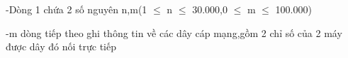 -Dòng 1 chứa 2 số nguyên n,m(1 $\le$ n $\le$ 30.000,0 $\le$ m $\le$ 100.000)  

   -m dòng tiếp theo ghi thông tin về các dây cáp mạng,gồm 2 chỉ số của 2 máy được dây đó nối trực tiếp